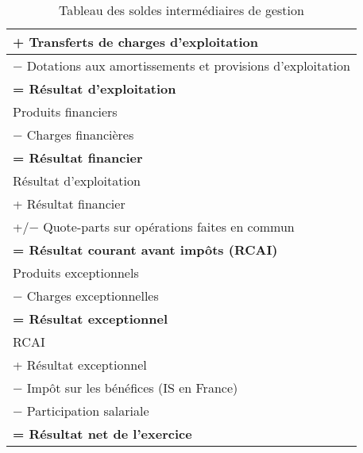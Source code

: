 \begin{table}[h]
\begin{tabular}{|l|}
\hline 
  + Transferts de charges d'exploitation \\                                                                      
\hline 
  $-$ Dotations aux amortissements et provisions d'exploitation \\                                                                      
\hline 
  \textbf{= Résultat d'exploitation} \\                                                                      
\hline  
  Produits financiers \\                                                                      
\hline 
  $-$ Charges financières \\                                                                      
\hline 
  \textbf{= Résultat financier} \\                                                                      
\hline 
  Résultat d'exploitation \\                                                                      
\hline  
  + Résultat financier \\                                                                      
\hline 
  +/$-$ Quote-parts sur opérations faites en commun \\                                                                      
\hline 
  \textbf{= Résultat courant avant impôts (RCAI)} \\                                                                     
\hline 
  Produits exceptionnels \\                                                                      
\hline  
  $-$ Charges exceptionnelles \\                                                                      
\hline 
  \textbf{= Résultat exceptionnel} \\                                                                 
\hline 
  RCAI \\                                                                      
\hline 
  + Résultat exceptionnel \\                                                                      
\hline   
  $-$ Impôt sur les bénéfices (IS en France) \\                                                                      
\hline    
  $-$ Participation salariale \\                                                                      
\hline    
  \textbf{= Résultat net de l'exercice} \\                                                                    
\hline     
\end{tabular}                                                                                                                                                                                                       
\caption{Tableau des soldes intermédiaires de gestion}       
\label{table:sig}                                                    
\end{table}